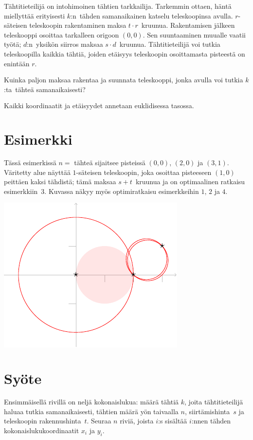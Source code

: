 
\noindent
Tähtitieteilijä on intohimoinen tähtien tarkkailija.
Tarkemmin ottaen, häntä miellyttää erityisesti $k$:n~tähden samanaikainen katselu teleskoopinsa avulla.
$r$-säteisen teleskoopin rakentaminen maksa $t\cdot r$~kruunua.
Rakentamisen jälkeen teleskooppi osoittaa tarkalleen origoon $(0,0)$.
Sen suuntaaminen muualle vaatii työtä;
$d$:n~yksikön siirros maksaa $s\cdot d$~kruunua.
Tähtitieteilijä voi tutkia teleskoopilla kaikkia tähtiä, joiden etäisyys teleskoopin osoittamasta pisteestä on enintään $r$.

Kuinka paljon maksaa rakentaa ja suunnata teleskooppi, jonka avulla voi tutkia $k$:ta~tähteä samanaikaisesti?

\medskip

Kaikki koordinaatit ja etäisyydet annetaan euklidisessa tasossa.


\section*{Esimerkki}

Tässä esimerkissä $n=$ tähteä sijaitsee pisteissä $(0,0)$, $(2,0)$ ja $(3,1)$.
Väritetty alue näyttää $1$-säteisen teleskoopin, joka osoittaa pisteeseen $(1,0)$ peittäen kaksi tähdistä; tämä maksaa $s + t$~kruunua ja on optimaalinen ratkaisu esimerkkiin~$3$.
Kuvassa näkyy myös optimiratkaisu esimerkkeihin $1$, $2$ ja $4$.

\medskip
\noindent
\includegraphics[width=.3\textwidth]{img/samples.pdf}


\section*{Syöte}

Ensimmäisellä rivillä on neljä kokonaislukua:
määrä tähtiä $k$, joita tähtitieteilijä haluaa tutkia samanaikaisesti,
tähtien määrä yön taivaalla $n$,
siirtämishinta~$s$
ja
teleskoopin rakennushinta~$t$.
Seuraa $n$ riviä,
joista $i$:s sisältää $i$:nnen tähden kokonaislukukoordinaatit $x_i$ ja $y_i$.

